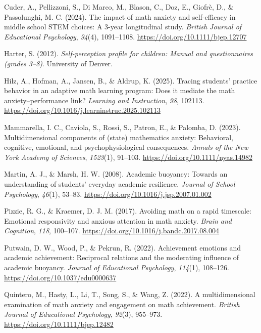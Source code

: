 \documentclass[
  man,
  floatsintext,
  longtable,
  nolmodern,
  notxfonts,
  notimes,
  colorlinks=true,linkcolor=blue,citecolor=blue,urlcolor=blue]{apa7}
\newlength{\cslhangindent}
\newenvironment{CSLReferences}[2] %
 {\begin{list}{}{%
  \setlength{\itemindent}{0pt}
  \setlength{\leftmargin}{0pt}
  \setlength{\parsep}{0pt}
  \ifodd #1
   \setlength{\leftmargin}{\cslhangindent}
   \setlength{\itemindent}{-1\cslhangindent}
  \fi
  \setlength{\itemsep}{#2\baselineskip}}}
 {\end{list}}
\begin{document}
\begin{CSLReferences}{1}{0}
Cuder, A., Pellizzoni, S., Di Marco, M., Blason, C., Doz, E., Giofrè,
D., \& Passolunghi, M. C. (2024). The impact of math anxiety and
self-efficacy in middle school {STEM} choices: A 3-year longitudinal
study. \emph{British Journal of Educational Psychology}, \emph{94}(4),
1091--1108. \url{https://doi.org/10.1111/bjep.12707}

Harter, S. (2012). \emph{Self-perception profile for children: Manual
and questionnaires (grades 3--8)}. University of Denver.

Hilz, A., Hofman, A., Jansen, B., \& Aldrup, K. (2025). Tracing
students' practice behavior in an adaptive math learning program: Does
it mediate the math anxiety--performance link? \emph{Learning and
Instruction}, \emph{98}, 102113.
\url{https://doi.org/10.1016/j.learninstruc.2025.102113}

Mammarella, I. C., Caviola, S., Rossi, S., Patron, E., \& Palomba, D.
(2023). Multidimensional components of (state) mathematics anxiety:
Behavioral, cognitive, emotional, and psychophysiological consequences.
\emph{Annals of the New York Academy of Sciences}, \emph{1523}(1),
91--103. \url{https://doi.org/10.1111/nyas.14982}

Martin, A. J., \& Marsh, H. W. (2008). Academic buoyancy: Towards an
understanding of students' everyday academic resilience. \emph{Journal
of School Psychology}, \emph{46}(1), 53--83.
\url{https://doi.org/10.1016/j.jsp.2007.01.002}

Pizzie, R. G., \& Kraemer, D. J. M. (2017). Avoiding math on a rapid
timescale: Emotional responsivity and anxious attention in math anxiety.
\emph{Brain and Cognition}, \emph{118}, 100--107.
\url{https://doi.org/10.1016/j.bandc.2017.08.004}

Putwain, D. W., Wood, P., \& Pekrun, R. (2022). Achievement emotions and
academic achievement: Reciprocal relations and the moderating influence
of academic buoyancy. \emph{Journal of Educational Psychology},
\emph{114}(1), 108--126. \url{https://doi.org/10.1037/edu0000637}

Quintero, M., Hasty, L., Li, T., Song, S., \& Wang, Z. (2022). A
multidimensional examination of math anxiety and engagement on math
achievement. \emph{British Journal of Educational Psychology},
\emph{92}(3), 955--973. \url{https://doi.org/10.1111/bjep.12482}


\end{CSLReferences}
\end{document}
